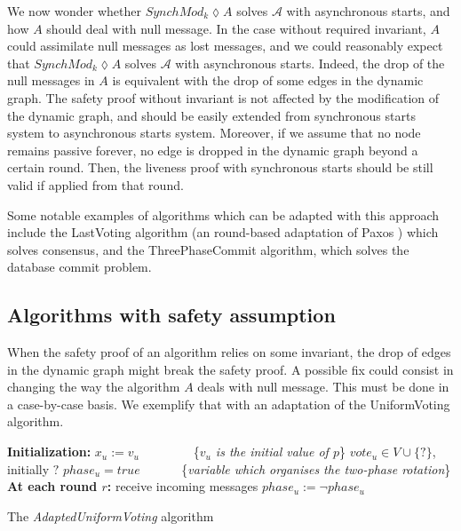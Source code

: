 \documentclass[11pt,letterpaper]{article}
\begin{document}
We now wonder whether $SynchMod_k \lozenge A$ solves $\mathcal{A}$ with asynchronous starts, and how $A$ should deal with null message.
In the case without required invariant, $A$ could assimilate null messages as lost messages,
and we could reasonably expect that $SynchMod_k \lozenge A$ solves $\mathcal{A}$ with asynchronous starts.
Indeed, the drop of the null messages in $A$ is equivalent with the drop of some edges in the dynamic graph.
The safety proof without invariant is not affected by the modification of the dynamic graph, and should be easily extended from synchronous starts system to asynchronous starts system.
Moreover, if we assume that no node remains passive forever, no edge is dropped in the dynamic graph beyond a certain round.
Then, the liveness proof with synchronous starts should be still valid if applied from that round.

Some notable examples of algorithms which can be adapted with this approach include the LastVoting \cite{CBS09} algorithm (an round-based adaptation of Paxos \cite{paxos}) which solves consensus,
and the ThreePhaseCommit \cite{BT93} algorithm, which solves the database commit problem.

\subsection{Algorithms with safety assumption}

When the safety proof of an algorithm relies on some invariant, the drop of edges in the dynamic graph might break the safety proof.
A possible fix could consist in changing the way the algorithm $A$ deals with null message. This must be done in a case-by-case basis.
We exemplify that with an adaptation of the UniformVoting \cite{CBS09} \cite{Ben83} algorithm.


\begin{algorithm}[htb]
	\DontPrintSemicolon
	\textbf{Initialization:} \;
	\Indp
		$x_u := v_u$ ~~~~~~~~\{\emph{$v_u$ is the initial value of $p$}\} \;
		$vote_u \in V\cup\{ ? \}$, initially $?$ \;
		$phase_u = true$ ~~~~~~\{\textit{variable which organises the two-phase rotation}\} \;
	\BlankLine
	\Indm
	\textbf{At each round $r$:} \;
	\Indp
		receive incoming messages \;
		$phase_u := \neg phase_u$ \;
	\Indm
\caption{The {\em AdaptedUniformVoting} algorithm}
\end{algorithm}
\end{document}
